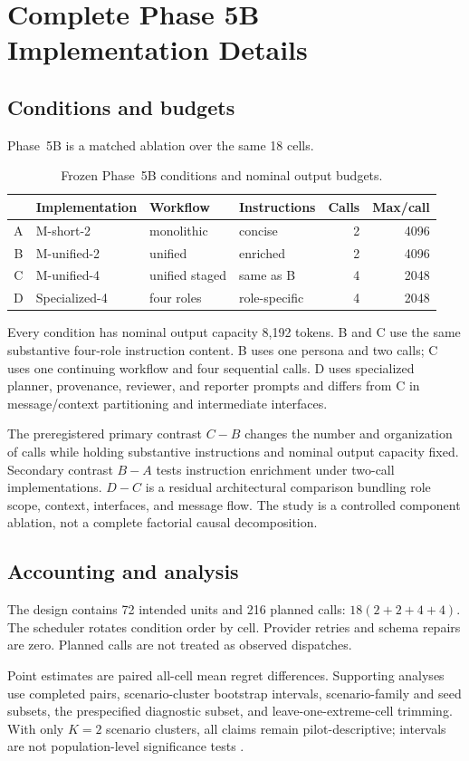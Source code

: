 \section{Complete Phase 5B Implementation Details}
\label{supp:implementation}

\subsection{Conditions and budgets}

Phase~5B is a matched ablation over the same 18 cells.
\begin{table}[t]
\centering
\begin{tabular}{@{}clllrr@{}}
\toprule
 & Implementation & Workflow & Instructions & Calls & Max/call \\
\midrule
A & M-short-2 & monolithic & concise & 2 & 4096 \\
B & M-unified-2 & unified & enriched & 2 & 4096 \\
C & M-unified-4 & unified staged & same as B & 4 & 2048 \\
D & Specialized-4 & four roles & role-specific & 4 & 2048 \\
\bottomrule
\end{tabular}
\caption{Frozen Phase~5B conditions and nominal output budgets.}
\end{table}
Every condition has nominal output capacity 8,192 tokens.  B and C use the
same substantive four-role instruction content.  B uses one persona and two
calls; C uses one continuing workflow and four sequential calls.  D uses
specialized planner, provenance, reviewer, and reporter prompts and differs
from C in message/context partitioning and intermediate interfaces.

The preregistered primary contrast \(C-B\) changes the number and organization
of calls while holding substantive instructions and nominal output capacity
fixed.  Secondary contrast \(B-A\) tests instruction enrichment under
two-call implementations.  \(D-C\) is a residual architectural comparison
bundling role scope, context, interfaces, and message flow.  The study is a
controlled component ablation, not a complete factorial causal decomposition.

\subsection{Accounting and analysis}

The design contains 72 intended units and 216 planned calls:
\(18(2+2+4+4)\).  The scheduler rotates condition order by cell.  Provider
retries and schema repairs are zero.  Planned calls are not treated as
observed dispatches.

Point estimates are paired all-cell mean regret differences.  Supporting
analyses use completed pairs, scenario-cluster bootstrap intervals,
scenario-family and seed subsets, the prespecified diagnostic subset, and
leave-one-extreme-cell trimming.  With only \(K=2\) scenario clusters, all
claims remain pilot-descriptive; intervals are not population-level
significance tests \citep{MacKinnonWebb2018}.
